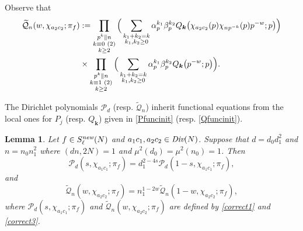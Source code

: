 \documentclass[12pt,reqno]{amsart}
\theoremstyle{plain}
\newtheorem{lemma}{Lemma}
\theoremstyle{remark}
\numberwithin{equation}{section}
\numberwithin{lemma}{section}
\numberwithin{theorem}{section}
\numberwithin{prop}{section}
\numberwithin{remark}{section}
\begin{document}
Observe that 
\begin{align}
\widetilde{\mathcal{Q}}_n(w,\chi_{a_2 c_2};\pi_f)&:=\prod_{\substack{p^k \parallel n \\
k \equiv 0 \hspace{0.1cm} (2) \\ k \geq 2}}
 \Big( \sum_{\substack{k_1+k_2=k \\ k_1,k_2 \geq 0}} 
 \alpha_p^{k_1} \beta_p^{k_2}  Q_{\boldsymbol{k}} \big(\chi_{a_2 c_2}(p) \chi_{n p^{-k}}(p) p^{-w};p \big) \Big ) \nonumber \\
 & \times \prod_{\substack{p^k \parallel n \\
k \equiv 1 \hspace{0.1cm} (2) \\ k \geq 2}} \Big( \sum_{\substack{k_1+k_2=k \\ k_1,k_2 \geq 0}} 
 \alpha_p^{k_1} \beta_p^{k_2} Q_{\boldsymbol{k}} \big(p^{-w};p \big) \Big ).
\end{align}

The Dirichlet polynomials $\mathcal{P}_d$ (resp. $\widetilde{\mathcal{Q}}_n$)
inherit functional equations from the local ones for $P_j$ (resp. $Q_{\boldsymbol{k}}$) 
given in \eqref{Pfuncinit} (resp. \eqref{Qfuncinit}).

\begin{lemma} \label{corrfunc}
Let $f \in S^{\emph{new}}_{\ell}(N)$ and $a_1 c_1, a_2 c_2 \in \emph{Div}(N)$.
Suppose that $d=d_0 d_1^2$ and $n=n_0 n_1^2$ where $(dn,2N)=1$ and $\mu^2(d_0)=\mu^2(n_0)=1$.
Then 
\begin{equation} \label{Pfunc}
 \mathcal{P}_d(s,\chi_{a_1 c_1};\pi_f)=d_1^{2-4s} \mathcal{P}_d(1-s,\chi_{a_1 c_1};\pi_f),
\end{equation}
and 
 \begin{equation} \label{Qfunc2}
\widetilde{\mathcal{Q}}_{n}(w,\chi_{a_2 c_2};\pi_f)=n_1^{1-2w} \widetilde{\mathcal{Q}}_{n} (1-w,\chi_{a_2 c_2};\pi_f),
 \end{equation} 
 where $\mathcal{P}_d(s,\chi_{a_1 c_1};\pi_f)$ and $\widetilde{\mathcal{Q}}_{n}(w,\chi_{a_2 c_2};\pi_f)$
 are defined by \eqref{correct1} and \eqref{correct3}.
\end{lemma}
\end{document}
